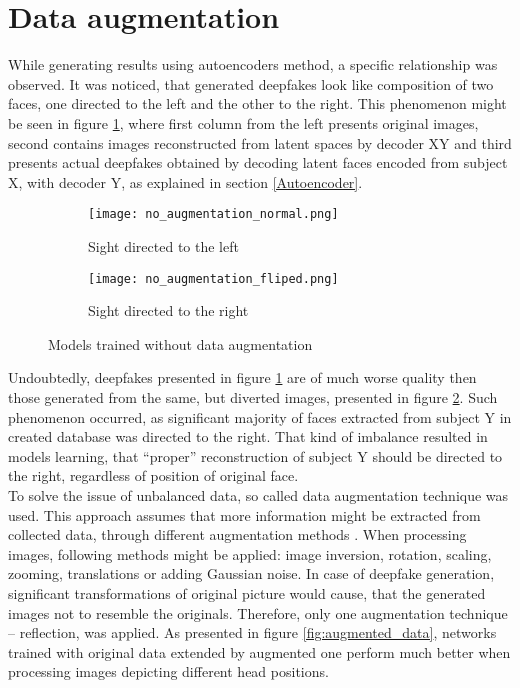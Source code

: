 \newpage
\section{Data augmentation}
While generating results using autoencoders method, a specific relationship was observed. It was noticed, that generated deepfakes look like composition of two faces, one directed to the left and the other to the right. This phenomenon might be seen in figure \ref{subfig:no_augmentation_normal}, where first column from the left presents original images, second contains images reconstructed from latent spaces by decoder XY and third presents actual deepfakes obtained by decoding latent faces encoded from subject X, with decoder Y, as explained in section \ref{Autoencoder}.

\begin{figure}[H]
\centering
\begin{subfigure}{.5\textwidth}
  \centering
  \texttt{[image: no\_augmentation\_normal.png]}
  \caption{Sight directed to the left}
  \label{subfig:no_augmentation_normal}
\end{subfigure}%
\begin{subfigure}{.5\textwidth}
  \centering
  \texttt{[image: no\_augmentation\_fliped.png]}
  \caption{Sight directed to the right}
  \label{subfig:no_augmentation_fliped}
\end{subfigure}
\caption{Models trained without data augmentation}
\label{fig:no_augmented_data}
\end{figure}

Undoubtedly, deepfakes presented in figure \ref{subfig:no_augmentation_normal} are of much worse quality then those generated from the same, but diverted images, presented in figure \ref{subfig:no_augmentation_fliped}. Such phenomenon occurred, as significant majority of faces extracted from subject Y in created database was directed to the right. That kind of imbalance resulted in models learning, that ``proper'' reconstruction of subject Y should be directed to the right, regardless of position of original face.\\

To solve the issue of unbalanced data, so called data augmentation technique was used. This approach assumes that more information might be extracted from collected data, through different augmentation methods \cite{data_augmentation_bib}. When processing images, following methods might be applied: image inversion, rotation, scaling, zooming, translations or adding Gaussian noise. In case of deepfake generation, significant transformations of original picture would cause, that the generated images not to resemble the originals. Therefore, only one augmentation technique -- reflection, was applied. As presented in figure \ref{fig:augmented_data}, networks trained with original data extended by augmented one perform much better when processing images depicting different head positions.

